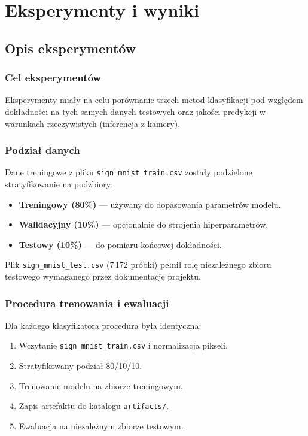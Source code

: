 \chapter{Eksperymenty i wyniki}
\label{cha:chapter003}

\section{Opis eksperymentów}

\subsection{Cel eksperymentów}

Eksperymenty miały na celu porównanie trzech metod klasyfikacji pod względem
dokładności na tych samych danych testowych oraz jakości predykcji w warunkach
rzeczywistych (inferencja z kamery).

\subsection{Podział danych}

Dane treningowe z pliku \texttt{sign\_mnist\_train.csv} zostały podzielone
stratyfikowanie na podzbiory:

\begin{itemize}
    \item \textbf{Treningowy (80\%)} --- używany do dopasowania parametrów modelu.
    \item \textbf{Walidacyjny (10\%)} --- opcjonalnie do strojenia hiperparametrów.
    \item \textbf{Testowy (10\%)} --- do pomiaru końcowej dokładności.
\end{itemize}

Plik \texttt{sign\_mnist\_test.csv} (7\,172 próbki) pełnił rolę niezależnego
zbioru testowego wymaganego przez dokumentację projektu.

\subsection{Procedura trenowania i ewaluacji}

Dla każdego klasyfikatora procedura była identyczna:

\begin{enumerate}
    \item Wczytanie \texttt{sign\_mnist\_train.csv} i normalizacja pikseli.
    \item Stratyfikowany podział 80/10/10.
    \item Trenowanie modelu na zbiorze treningowym.
    \item Zapis artefaktu do katalogu \texttt{artifacts/}.
    \item Ewaluacja na niezależnym zbiorze testowym.
\end{enumerate}

